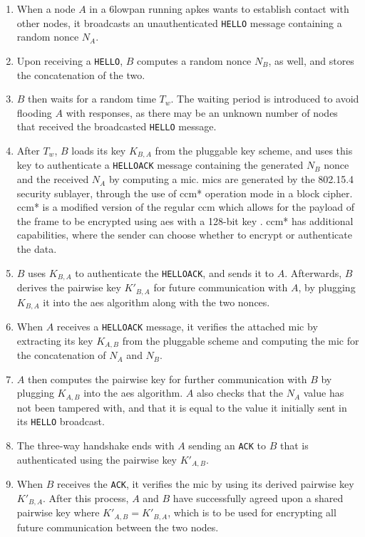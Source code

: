 \begin{enumerate}

\item When a node $A$ in a \gls{6lowpan} running \gls{apkes} wants to establish contact with other nodes, it broadcasts an unauthenticated \texttt{HELLO} message containing a random nonce $N_A$.

\item Upon receiving a \texttt{HELLO}, $B$ computes a random nonce $N_B$, as well, and stores the concatenation of the two.

\item $B$ then waits for a random time $T_w$. The waiting period is introduced to avoid flooding $A$ with responses, as there may be an unknown number of nodes that received the broadcasted \texttt{HELLO} message.

\item After $T_w$, $B$ loads its key $K_{B,A}$ from the pluggable key scheme, and uses this key to authenticate a \texttt{HELLOACK} message containing the generated $N_B$ nonce and the received $N_A$ by computing a \gls{mic}. \gls{mic}s are generated by the 802.15.4 security sublayer, through the use of \gls{ccm}* operation mode in a block cipher. \gls{ccm}* is a modified version of the regular \gls{ccm} which allows for the payload of the frame to be encrypted using \gls{aes} with a 128-bit key \cite{krentz20136lowpan}. \gls{ccm}* has additional capabilities, where the sender can choose whether to encrypt or authenticate the data.

\item $B$ uses $K_{B,A}$ to authenticate the \texttt{HELLOACK}, and sends it to $A$. Afterwards, $B$ derives the pairwise key $K'_{B,A}$ for future communication with $A$, by plugging $K_{B,A}$ it into the \gls{aes} algorithm along with the two nonces.

\item When $A$ receives a \texttt{HELLOACK} message, it verifies the attached \gls{mic} by extracting its key $K_{A,B}$ from the pluggable scheme and computing the \gls{mic} for the concatenation of $N_A$ and $N_B$.

\item $A$ then computes the pairwise key for further communication with $B$ by plugging $K_{A,B}$ into the \gls{aes} algorithm. $A$ also checks that the $N_A$ value has not been tampered with, and that it is equal to the value it initially sent in its \texttt{HELLO} broadcast.

\item The three-way handshake ends with $A$ sending an \texttt{ACK} to $B$ that is authenticated using the pairwise key $K'_{A,B}$.

\item When $B$ receives the \texttt{ACK}, it verifies the \gls{mic} by using its derived pairwise key $K'_{B,A}$. After this process, $A$ and $B$ have successfully agreed upon a shared pairwise key where $K'_{A,B} = K'_{B,A}$, which is to be used for encrypting all future communication between the two nodes.

\end{enumerate}

